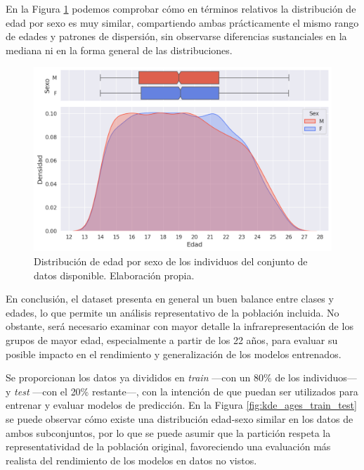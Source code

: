 En la Figura \ref{fig:kde_and_boxplot_ages_sex} podemos comprobar cómo en términos relativos la distribución 
de edad por sexo es muy similar, compartiendo ambas prácticamente el mismo rango de edades y patrones de 
dispersión, sin observarse diferencias sustanciales en la mediana ni en la forma general de las 
distribuciones.

\begin{figure}[h]
    \centering
    \includegraphics[width=\textwidth]{capitulos/cap_04/imagenes/kdeplot_ages.png}
    \caption[
        Distribución de edad por sexo de los individuos del conjunto de datos disponible.
    ]{
        Distribución de edad por sexo de los individuos del conjunto de datos disponible. Elaboración propia.
    } 
    \label{fig:kde_and_boxplot_ages_sex}
\end{figure}

En conclusión, el dataset presenta en general un buen balance entre clases y edades, lo que permite un 
análisis representativo de la población incluida. No obstante, será necesario examinar con mayor detalle la 
infrarepresentación de los grupos de mayor edad, especialmente a partir de los 22 años, para evaluar su 
posible impacto en el rendimiento y generalización de los modelos entrenados.

Se proporcionan los datos ya divididos en \textit{train} ---con un 80\% de los individuos--- y \textit{test}
---con el 20\% restante---, con la intención de que puedan ser utilizados para entrenar y evaluar modelos de 
predicción. En la Figura \ref{fig:kde_ages_train_test} se puede observar cómo existe una distribución 
edad-sexo similar en los datos de ambos subconjuntos, por lo que se puede asumir que la partición respeta la 
representatividad de la población original, favoreciendo una evaluación más realista del rendimiento de los 
modelos en datos no vistos.


